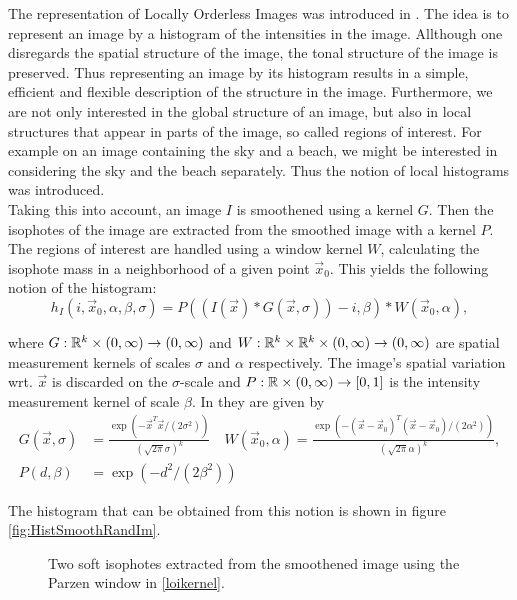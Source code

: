 The representation of Locally Orderless Images was introduced in \cite{koe.99}. The idea is to represent an image by a histogram of the intensities in the image. Allthough one disregards the spatial structure of the image, the tonal structure of the image is preserved. Thus representing an image by its histogram results in a simple, efficient and flexible description of the structure in the image. Furthermore, we are not only interested in the global structure of an image, but also in local structures that appear in parts of the image, so called regions of interest. For example on an image containing the sky and a beach, we might be interested in considering the sky and the beach separately. Thus the notion of local histograms was introduced.\\

Taking this into account, an image $I$ is smoothened using a kernel $G$. Then the isophotes of the image are extracted from the smoothed image with a kernel $P$.\\
The regions of interest are handled using a window kernel $W$, calculating the isophote mass in a neighborhood of a given point $\vec{x}_0$. This yields the following notion of the histogram:
\begin{equation}
  h_I(i,\vec{x}_0,\alpha,\beta,\sigma) = P((I(\vec{x})*G(\vec{x},\sigma))-i,\beta)*W(\vec{x}_0,\alpha),
\end{equation}

where $G:\mathbb R^k\times (0,\infty)\to (0,\infty)$ and $W:\mathbb R^k\times \mathbb R^k\times (0,\infty)\to (0,\infty)$ are spatial measurement kernels of scales $\sigma$ and $\alpha$ respectively. The image's spatial variation wrt. $\vec{x}$ is discarded on the $\sigma$-scale and $P:\mathbb R\times(0,\infty)\to [0,1]$ is the intensity measurement kernel of scale $\beta$. In \cite{koe.99} they are given by
\begin{equation}
  \begin{split}
    G(\vec{x},\sigma) &= \frac{\exp(-\vec{x}^T\vec{x}/(2\sigma^2))}{(\sqrt{2\pi}\sigma)^{k}}\quad W(\vec{x}_0,\alpha) = \frac{\exp(-(\vec{x}-\vec{x}_0)^T(\vec{x}-\vec{x}_0)/(2\alpha^2))}{(\sqrt{2\pi}\alpha)^{k}},\\
    P(d,\beta) &= \exp(-d^2/(2\beta^2))
  \end{split}\label{loikernel}
\end{equation}

The histogram that can be obtained from this notion is shown in figure \ref{fig:HistSmoothRandIm}.

\begin{figure}
  \centering
  \quad
  \caption{Two soft isophotes extracted from the smoothened image using the Parzen window in \eqref{loikernel}.}\label{fig:SoftIso}
\end{figure}

